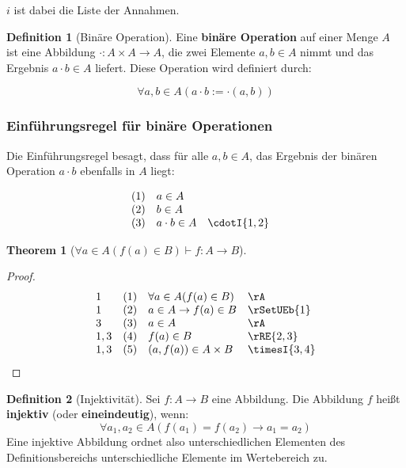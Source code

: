 \documentclass{book}
\theoremstyle{plain}
\newtheorem{theorem}{Theorem}
\theoremstyle{remark}
\theoremstyle{definition}
\newtheorem{definition}{Definition}[section]
\begin{document}
\(i\) ist dabei die Liste der Annahmen.

\begin{definition}[Binäre Operation]
    Eine \textbf{binäre Operation} auf einer Menge \( A \) ist eine Abbildung \( \cdot : A \times A \to A \), die zwei Elemente \( a, b \in A \) nimmt und das Ergebnis \( a \cdot b \in A \) liefert. Diese Operation wird definiert durch:
    
    \[
    \forall a,b\in A(a \cdot b := \cdot(a, b)) 
    \]
\end{definition}

\subsubsection*{Einführungsregel für binäre Operationen}
\label{rule:cdotI}

Die Einführungsregel besagt, dass für alle \( a, b \in A \), das Ergebnis der binären Operation \( a \cdot b \) ebenfalls in \( A \) liegt:

\[
\begin{array}{llll}
    (1) & a \in A & & \\
    (2) & b \in A & & \\
    (3) & a \cdot b \in A & \cdotI{1,2} & 
\end{array}
\]


\begin{theorem}[\(\forall a\in A(f(a)\in B)\vdash f:A\rightarrow B\)]
\end{theorem}
\begin{proof}
	\[
	\begin{array}{llll}
		1   &  (1) & \forall a\in A(f(a)\in B) & \rA \\
            1   &  (2) & a\in A\rightarrow f(a)\in B & \rSetUEb{1} \\
            3   &  (3) & a\in A & \rA \\
            1,3 &  (4) & f(a)\in B & \rRE{2,3} \\
            1,3 &  (5) & (a,f(a))\in A\times B & \timesI{3,4} \\
	\end{array}
	\]
\end{proof}

\begin{definition}[Injektivität]
    Sei \( f: A \to B \) eine Abbildung. Die Abbildung \( f \) heißt \textbf{injektiv} (oder \textbf{eineindeutig}), wenn:
    \[
    \forall a_1,a_2\in A(f(a_1) = f(a_2) \rightarrow a_1 = a_2)
    \]
    Eine injektive Abbildung ordnet also unterschiedlichen Elementen des Definitionsbereichs unterschiedliche Elemente im Wertebereich zu.
\end{definition}
\end{document}
